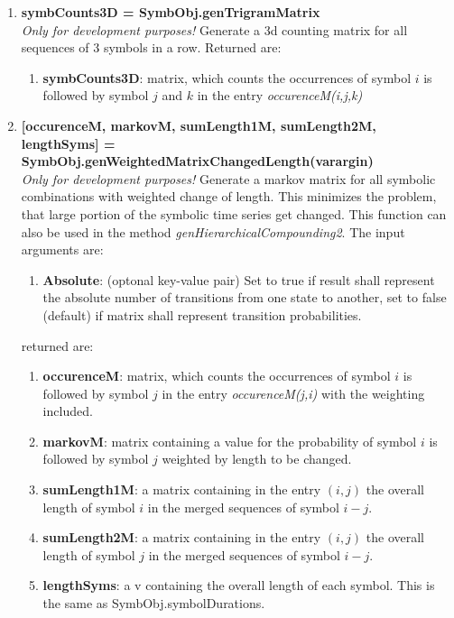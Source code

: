 \documentclass[a4]{scrreprt}
\begin{document}
\begin{enumerate}
	\item \textbf{symbCounts3D =  SymbObj.genTrigramMatrix}\\
		\textit{Only for development purposes!} Generate a 3d counting matrix for all sequences of 3 symbols in a row.
		Returned are:
		\begin{enumerate}
			\item \textbf{symbCounts3D}: matrix, which counts the occurrences of symbol $i$ is followed by symbol $j$ and $k$ in the entry \textit{occurenceM(i,j,k)}
		\end{enumerate}


	\item \textbf{[occurenceM, markovM, sumLength1M, sumLength2M, lengthSyms] =\\ SymbObj.genWeightedMatrixChangedLength(varargin)}\\
		\textit{Only for development purposes!} Generate a markov matrix for all symbolic
		 combinations with weighted change of length. This minimizes the problem, that large portion of the symbolic time series get changed.
		 This function can also be used in the method \textit{genHierarchicalCompounding2}.
		 The input arguments are:
		 \begin{enumerate}
		 	\item \textbf{Absolute}: (optonal key-value pair) Set to true if result shall represent the  absolute number of transitions from one state to another, set to false (default) if matrix shall represent transition  probabilities.
		 \end{enumerate}
		 returned are:
		 \begin{enumerate}
		 	\item \textbf{occurenceM}: matrix, which counts the occurrences of symbol $i$ is followed by symbol $j$ in the entry \textit{occurenceM(j,i)}  with the weighting included.
		 	\item \textbf{markovM}:  matrix containing a value for the probability of symbol $i$ is followed by symbol $j$ weighted by length to be changed.
		 	\item \textbf{sumLength1M}: a matrix containing in the entry $(i,j)$ the overall length of symbol $i$ in the merged sequences of symbol $i-j$.
		 	\item \textbf{sumLength2M}: a matrix containing in the entry $(i,j)$ the overall length of symbol $j$ in the merged sequences of symbol $i-j$.
		 	\item \textbf{lengthSyms}: a v containing  the overall length of each symbol. This is the same as SymbObj.symbolDurations.
		 \end{enumerate}
	 

\end{enumerate}
\end{document}
